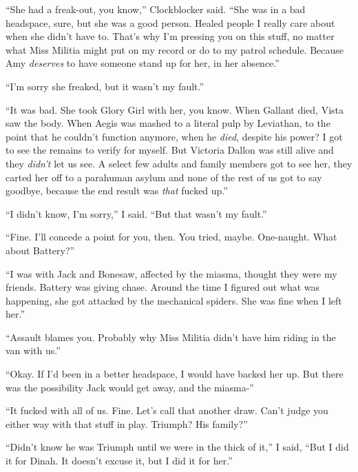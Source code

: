 ``She had a freak-out, you know,'' Clockblocker said.  ``She was in a bad headspace, sure, but she was a good person.  Healed people I really care about when she didn't have to.  That's why I'm pressing you on this stuff, no matter what Miss Militia might put on my record or do to my patrol schedule.  Because Amy \emph{deserves} to have someone stand up for her, in her absence.''



``I'm sorry she freaked, but it wasn't my fault.''



``It was bad.  She took Glory Girl with her, you know.  When Gallant died, Vista saw the body.  When Aegis was mashed to a literal pulp by Leviathan, to the point that he couldn't function anymore, when he \emph{died}, despite his power?  I got to see the remains to verify for myself.  But Victoria Dallon was still alive and they \emph{didn't} let us see.  A select few adults and family members got to see her, they carted her off to a parahuman asylum and none of the rest of us got to say goodbye, because the end result was \emph{that} fucked up.''



``I didn't know, I'm sorry,'' I said.  ``But that wasn't my fault.''



``Fine.  I'll concede a point for you, then.  You tried, maybe.  One-naught.  What about Battery?''



``I was with Jack and Bonesaw, affected by the miasma, thought they were my friends.  Battery was giving chase.  Around the time I figured out what was happening, she got attacked by the mechanical spiders.  She was fine when I left her.''



``Assault blames you.  Probably why Miss Militia didn't have him riding in the van with us.''



``Okay.  If I'd been in a better headspace, I would have backed her up.  But there was the possibility Jack would get away, and the miasma-''



``It fucked with all of us.  Fine.  Let's call that another draw.  Can't judge you either way with that stuff in play.  Triumph?  His family?''



``Didn't know he was Triumph until we were in the thick of it,'' I said,  ``But I did it for Dinah.  It doesn't excuse it, but I did it for her.''



